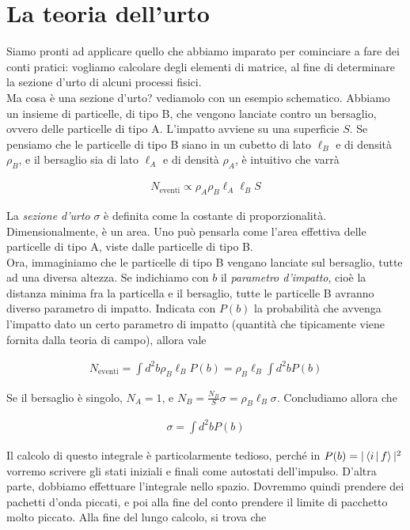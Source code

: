 \documentclass[11pt]{report}
\begin{document}
\chapter{La teoria dell'urto}

Siamo pronti ad applicare quello che abbiamo imparato per cominciare a fare dei conti pratici: vogliamo calcolare degli elementi di matrice, al fine di determinare la sezione d'urto di alcuni processi fisici. \\

Ma cosa è una sezione d'urto? vediamolo con un esempio schematico. Abbiamo un insieme di particelle, di tipo B, che vengono lanciate contro un bersaglio, ovvero delle particelle di tipo A. L'impatto avviene su una superficie \(S\). Se pensiamo che le particelle di tipo B siano in un cubetto di lato \(\ell_B\) e di densità \(\rho_B\), e il bersaglio sia di lato \(\ell_A\) e di densità \(\rho_A\), è intuitivo che varrà

\begin{align}
    N_{\text{eventi}} \propto \rho_A \rho_B \ell_A \ell_B S
\end{align}

La \emph{sezione d'urto} \(\sigma\) è definita come la costante di proporzionalità. Dimensionalmente, è un area. Uno può pensarla come l'area effettiva delle particelle di tipo A, viste dalle particelle di tipo B. \\

Ora, immaginiamo che le particelle di tipo B vengano lanciate sul bersaglio, tutte ad una diversa altezza. Se indichiamo con \(b\) il \emph{parametro d'impatto}, cioè la distanza minima fra la particella e il bersaglio, tutte le particelle B avranno diverso parametro di impatto. Indicata con \(P(b)\) la probabilità che avvenga l'impatto dato un certo parametro di impatto (quantità che tipicamente viene fornita dalla teoria di campo), allora vale 

\begin{align}
    N_{\text{eventi}} = \int d^2b \rho_B \ell_B P(b) = \rho_B \ell_B \int d^2b  P(b) 
\end{align}

Se il bersaglio è singolo, \(N_A = 1\), e \(N_B = \frac{N_B}{S}\sigma = \rho_B \ell_B \sigma \). Concludiamo allora che 

\begin{align}
    \sigma = \int d^2b P(b)
\end{align}

Il calcolo di questo integrale è particolarmente tedioso, perché in \(P(b) = |\Braket{i|f}|^2\) vorremo scrivere gli stati iniziali e finali come autostati dell'impulso. D'altra parte, dobbiamo effettuare l'integrale nello spazio. Dovremmo quindi prendere dei pachetti d'onda piccati, e poi alla fine del conto prendere il limite di pacchetto molto piccato. Alla fine del lungo calcolo, si trova che 
\end{document}
